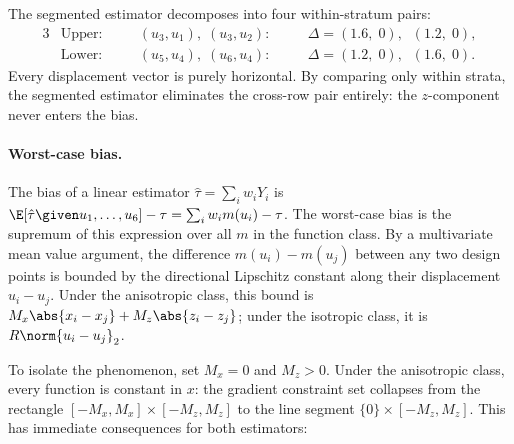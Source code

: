 The segmented estimator decomposes into four within-stratum pairs:
\begin{alignat*}{3}
	&\text{Upper:}  &\quad& (u_3, u_1), \; (u_3, u_2): &\quad& \Delta = (1.6,\; 0), \;\; (1.2,\; 0), \\
	&\text{Lower:}  &\quad& (u_5, u_4), \; (u_6, u_4): &\quad& \Delta = (1.2,\; 0), \;\; (1.6,\; 0).
\end{alignat*}
Every displacement vector is purely horizontal.
By comparing only within strata, the segmented estimator eliminates the cross-row pair entirely: the $z$-component never enters the bias.

\paragraph{Worst-case bias.}
The bias of a linear estimator $\hat\tau = \sum_i w_i Y_i$ is $\E[\hat\tau \given u_1, \ldots, u_6] - \tau = \sum_i w_i m(u_i) - \tau$.
The worst-case bias is the supremum of this expression over all $m$ in the function class.
By a multivariate mean value argument, the difference $m(u_i) - m(u_j)$ between any two design points is bounded by the directional Lipschitz constant along their displacement $u_i - u_j$.
Under the anisotropic class, this bound is $M_x \abs{x_i - x_j} + M_z \abs{z_i - z_j}$; under the isotropic class, it is $R \norm{u_i - u_j}_2$.

To isolate the phenomenon, set $M_x = 0$ and $M_z > 0$.
Under the anisotropic class, every function is constant in $x$: the gradient constraint set collapses from the rectangle $[-M_x, M_x] \times [-M_z, M_z]$ to the line segment $\{0\} \times [-M_z, M_z]$.
This has immediate consequences for both estimators:

